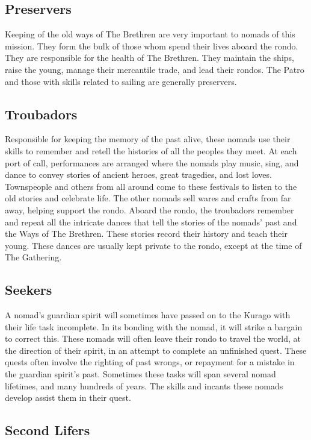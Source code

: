 \subsection{Preservers}

Keeping of the old ways of The Brethren are very important to nomads of this mission. They form the bulk of those whom spend their lives aboard the rondo. They are responsible for the health of The Brethren. They maintain the ships, raise the young, manage their mercantile trade, and lead their rondos. The Patro and those with skills related to sailing are generally preservers.

\subsection{Troubadors}

Responsible for keeping the memory of the past alive, these nomads use their skills to remember and retell the histories of all the peoples they meet. At each port of call, performances are arranged where the nomads play music, sing, and dance to convey stories of ancient heroes, great tragedies, and lost loves. Townspeople and others from all around come to these festivals to listen to the old stories and celebrate life. The other nomads sell wares and crafts from far away, helping support the rondo. Aboard the rondo, the troubadors remember and repeat all the intricate dances that tell the stories of the nomads' past and the Ways of The Brethren. These stories record their history and teach their young. These dances are usually kept private to the rondo, except at the time of The Gathering.

\subsection{Seekers}

A nomad's guardian spirit will sometimes have passed on to the Kurago with their life task incomplete. In its bonding with the nomad, it will strike a bargain to correct this. These nomads will often leave their rondo to travel the world, at the direction of their spirit, in an attempt to complete an unfinished quest. These quests often involve the righting of past wrongs, or repayment for a mistake in the guardian spirit's past. Sometimes these tasks will span several nomad lifetimes, and many hundreds of years. The skills and incants these nomads develop assist them in their quest.

\subsection{Second Lifers}

